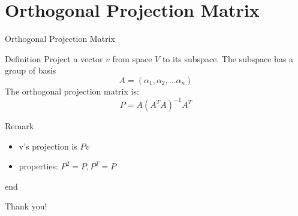 \documentclass[aspectratio=169, UTF8]{ctexbeamer}
\begin{document}
\section{Orthogonal Projection Matrix}
\begin{frame}[label=5]{Orthogonal Projection Matrix}
        \begin{block}{Definition} 
        Project a vector $v$ from space $V$ to its subspace. The subspace has a group of basis
        \begin{equation*}
            A=(\alpha_1,\alpha_2,\dots\alpha_n)
        \end{equation*}
        The orthogonal projection matrix is:
        \begin{equation*}
            P=A(A^TA)^{-1}A^T
        \end{equation*}
        \end{block}
        \begin{block}{Remark}
            \begin{itemize}
                \item v's projection is $Pv$
                \item properties: $P^2=P,P^T=P$
            \end{itemize}
        \end{block}
\end{frame}
    


\begin{frame}{\textcolor{green!30!black}{end}}
    \begin{center}
        \LARGE Thank you!
    \end{center}
\end{frame}
\end{document}
